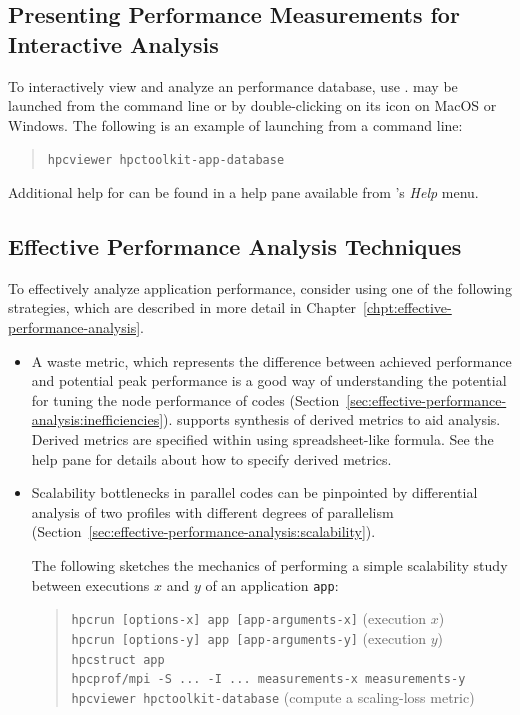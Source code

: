 \documentclass[11pt,letterpaper]{report}
\begin{document}

\subsection{Presenting Performance Measurements for Interactive Analysis}

To interactively view and analyze an \HPCToolkit{} performance database, use \hpcviewer{}.
\hpcviewer{} may be launched from the command line or by double-clicking on its icon on MacOS or Windows.
The following is an example of launching from a command line:
\begin{quote}
  \verb|hpcviewer hpctoolkit-app-database|
\end{quote}
Additional help for \hpcviewer{} can be found in a help pane available from \hpcviewer{}'s \emph{Help} menu.


\subsection{Effective Performance Analysis Techniques}

To effectively analyze application performance, consider using one of the following strategies, which are described in more detail in Chapter~\ref{chpt:effective-performance-analysis}.
\begin{itemize}
\item
A waste metric, which represents the difference between achieved performance and potential peak performance is a good way of understanding the potential for tuning the node performance of codes (Section~\ref{sec:effective-performance-analysis:inefficiencies}).
\hpcviewer{} supports synthesis of derived metrics to aid analysis.
Derived metrics are specified within \hpcviewer{} using spreadsheet-like formula.
See the \hpcviewer{} help pane for details about how to specify derived metrics.

\item
Scalability bottlenecks in parallel codes can be pinpointed by differential analysis of two profiles with different degrees of parallelism (Section~\ref{sec:effective-performance-analysis:scalability}).

The following sketches the mechanics of performing a simple scalability study between executions $x$ and $y$ of an application \texttt{app}:
\begin{quote}
  \verb|hpcrun [options-x] app [app-arguments-x]| \hfill (execution $x$) \\
  \verb|hpcrun [options-y] app [app-arguments-y]| \hfill (execution $y$) \\
  \verb|hpcstruct app| \\
  \verb|hpcprof/mpi -S ... -I ... measurements-x measurements-y| \\
  \verb|hpcviewer hpctoolkit-database| \hfill (compute a scaling-loss metric)
\end{quote}

\end{itemize}
\end{document}
